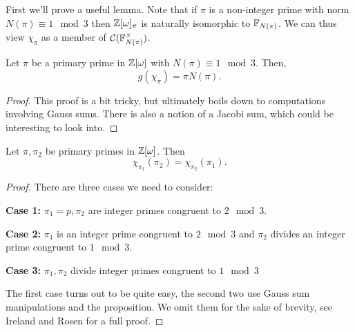 \documentclass[utf8, letterpaper]{article}
\begin{document}
First we'll prove a useful lemma. Note that if $\pi$ is a non-integer prime with norm $N(\pi)\equiv 1\mod 3$ then $\mathbb{Z}[\omega]_\pi$ is naturally isomorphic to $\mathbb{F}_{N(\pi)}$. We can thus view $\chi_\pi$ as a member of $\mathcal{C}(\mathbb{F}_{N(\pi)}^\times)$.

\begin{proposition}
    Let $\pi$ be a primary prime in $\mathbb{Z}[\omega]$ with $N(\pi)\equiv 1\mod 3$. Then,
    \[g(\chi_{\pi})=\pi N(\pi).\]  
\end{proposition}
\begin{proof}
    This proof is a bit tricky, but ultimately boils down to computations involving Gauss sums. There is also a notion of a Jacobi sum, which could be interesting to look into.
\end{proof}

\begin{theorem}
    Let $\pi, \pi_2$ be primary primes in $\mathbb{Z}[\omega]$. Then
    \[
        \chi_{\pi_1}(\pi_2)=\chi_{\pi_2}(\pi_1)
    .\] 
\end{theorem}
\begin{proof}
    There are three cases we need to consider:
    
    \noindent
    \textbf{Case 1:} $\pi_1=p, \pi_2$ are integer primes congruent to $2\mod 3$.
    
    \medskip
    \noindent
    \textbf{Case 2:} $\pi_1$ is an integer prime congruent to $2\mod 3$ and $\pi_2$ divides an integer prime congruent to $1\mod 3$.

    \medskip
    \noindent
    \textbf{Case 3:} $\pi_1,\pi_2$ divide integer primes congruent to $1\mod 3$
    
    \medskip
    The first case turns out to be quite easy, the second two use Gauss sum manipulations and the proposition. We omit them for the sake of brevity, see Ireland and Rosen for a full proof.
\end{proof}
\end{document}
